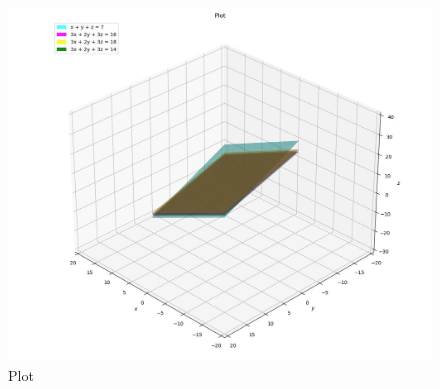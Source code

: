 \documentclass[journal]{IEEEtran}
\begin{document}
\begin{figure}[h!]
	\centering
	\includegraphics[width=\columnwidth]{figs/plot_p.jpg}
	\caption*{Plot}
	\label{fig:fig}
\end{figure}
\end{document}

